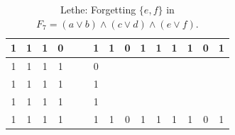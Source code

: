 \begin{table}[!tb]
\begin{tabular}{|c|c|c|c|c|c|c|c|c|c|c|c|c|c|c|}
        \rowcolor{yellow!40} 1 & 1 & 1 & 0 &  &  & 1 & 1 & 0 & 1 & 1 & 1 & 1 & 0 & 1 \\ \hline
        \rowcolor{gray!40} 1 & 1 & 1 & 1 &  &  & 0 &  &  &  &  &  &  &  &  \\ \hline
        \rowcolor{gray!40} 1 & 1 & 1 & 1 &  &  & 1 &  &  &  &  &  &  &  &  \\ \hline
        \rowcolor{gray!40} 1 & 1 & 1 & 1 &  &  & 1 &  &  &  &  &  &  &  &  \\ \hline
        \rowcolor{gray!40} 1 & 1 & 1 & 1 &  &  & 1 & 1 & 0 & 1 & 1 & 1 & 1 & 0 & 1 \\ \hline
    \end{tabular}
    \caption{Lethe: Forgetting $\{e, f\}$ in $F_{7} = (a \lor b) \land (c \lor d) \land (e \lor f)$.}
    \label{tab:lethe-F7-ef}
\end{table}

